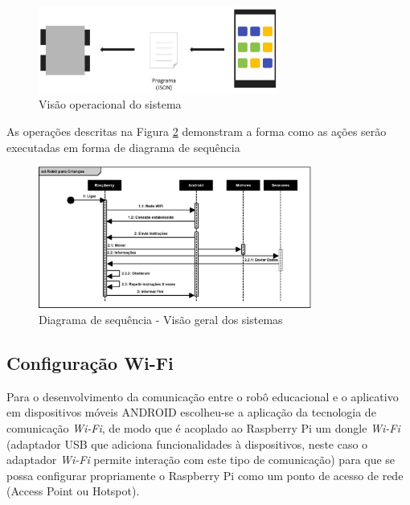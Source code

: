 \begin{figure}[H]
    \centering
    \includegraphics[width=0.7\textwidth]{figuras/overview.eps}
    \caption{Visão operacional do sistema}
    \label{fig:overview}
\end{figure}

As operações descritas na Figura \ref{fig:sequencia} demonstram a forma como as ações serão executadas em forma de diagrama de sequência

\begin{figure}[H]
    \centering
    \includegraphics[width=0.8\textwidth]{figuras/diagrama_de_sequencia.eps}
    \caption{Diagrama de sequência - Visão geral dos sistemas}
    \label{fig:sequencia}
\end{figure}

\subsection{Configuração Wi-Fi}

Para o desenvolvimento da comunicação entre o robô educacional e o aplicativo em dispositivos móveis ANDROID escolheu-se a aplicação da
tecnologia de comunicação \textit{Wi-Fi}, de modo que é acoplado ao Raspberry Pi um dongle \textit{Wi-Fi} (adaptador USB que adiciona funcionalidades à
dispositivos, neste caso o adaptador \textit{Wi-Fi} permite interação com este tipo de comunicação) para que se possa configurar propriamente o
Raspberry Pi como um ponto de acesso de rede (Access Point ou Hotspot).

